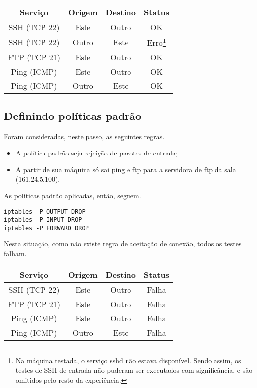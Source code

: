 \documentclass[a4paper,titlepage,11pt]{article}
\begin{document}
\begin{minipage}{\textwidth}
	\begin{center}
		\begin{tabular}{cccc}
			\hline
			Serviço & Origem & Destino & Status  \\
			\hline
			SSH (TCP 22) & Este & Outro & OK \\
			SSH (TCP 22) & Outro & Este & Erro\footnote{Na máquina testada, o serviço sshd não estava disponível. Sendo assim, os testes de SSH de entrada não puderam ser executados com significância, e são omitidos pelo resto da experiência.} \\
			FTP (TCP 21) & Este & Outro & OK \\
			Ping (ICMP) & Este & Outro & OK \\
			Ping (ICMP) & Outro & Este & OK \\
			\hline
		\end{tabular}
	\end{center}
\end{minipage}

\subsection{Definindo políticas padrão}

Foram consideradas, neste passo, as seguintes regras.
\begin{itemize}
	\item A política padrão seja rejeição de pacotes de entrada;
	\item A partir de sua máquina só sai ping e ftp para a servidora de ftp da sala (161.24.5.100).
\end{itemize}

As políticas padrão aplicadas, então, seguem.
\begin{Verbatim}
iptables -P OUTPUT DROP
iptables -P INPUT DROP
iptables -P FORWARD DROP
\end{Verbatim}

Nesta situação, como não existe regra de aceitação de conexão, todos os testes falham.
\begin{center}
	\begin{tabular}{cccc}
		\hline
		Serviço & Origem & Destino & Status  \\
		\hline
		SSH (TCP 22) & Este & Outro & Falha \\
		FTP (TCP 21) & Este & Outro & Falha \\
		Ping (ICMP) & Este & Outro & Falha \\
		Ping (ICMP) & Outro & Este & Falha \\
		\hline
	\end{tabular}
\end{center}
\end{document}
